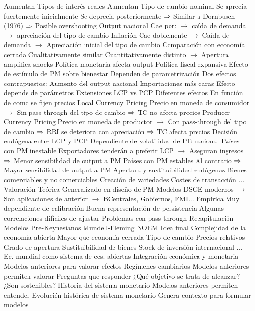 \documentclass{nuevotema}
\begin{document}
\begin{esquemal}
				\4[] Aumentan
				\4 Tipos de interés reales
				\4[] Aumentan
				\4 Tipo de cambio nominal
				\4[] Se aprecia fuertemente inicialmente
				\4[] Se deprecia posteriormente
				\4[] $\then$ Similar a Dornbusch (1976)
				\4[] $\then$ Posible overshooting
				\4 Output nacional
				\4[] Cae por:
				\4[] $\to$ caída de demanda
				\4[] $\to$ apreciación del tipo de cambio
				\4 Inflación
				\4[] Cae doblemente
				\4[] $\to$ Caída de demanda
				\4[] $\to$ Apreciación inicial del tipo de cambio
				\4 Comparación con economía cerrada
				\4[] Cualitativamente similar
				\4[] Cuantitativamente distinto
				\4[] $\to$ Apertura amplifica shocks
				\4[$\then$] Política monetaria afecta output
			\3 Política fiscal expansiva
			\3 Efecto de estímulo de PM sobre bienestar
				\4 Dependen de parametrización
				\4[] Dos efectos contrapuestos:
				\4 Aumento del output nacional
				\4 Importaciones más caras
				\4[$\then$] Efecto depende de parámetros
		\2 Extensiones
			\3 LCP vs PCP
				\4 Diferentes efectos
				\4[] En función de como se fijen precios
				\4 Local Currency Pricing
				\4[] Precio en moneda de consumidor
				\4[] $\to$ Sin pass-through del tipo de cambio
				\4[] $\then$ TC no afecta precios
				\4 Producer Currency Pricing
				\4[] Precio en moneda de productor
				\4[] $\to$ Con pass-through del tipo de cambio
				\4[] $\then$ RRI se deteriora con apreciación
				\4[] $\then$ TC afecta precios
			\3 Decisión endógena entre LCP y PCP
				\4 Dependiente de volatilidad de PE nacional
				\4 Países con PM inestable
				\4[] Exportadores tenderán a preferir LCP
				\4[] $\to$ Aseguran ingresos
				\4[] $\then$ Menor sensibilidad de output a PM
				\4 Países con PM estables
				\4[] Al contrario
				\4[] $\then$ Mayor sensibilidad de output a PM
			\3 Apertura y sustituibilidad endógenas
			\3 Bienes comerciables y no comerciables
			\3 Creación de variedades
			\3 Costes de transacción
			\3 ...
		\2 Valoración
			\3 Teórica
				\4 Generalizado en diseño de PM
				\4 Modelos DSGE modernos
				\4[] $\to$ Son aplicaciones de anterior
				\4[] $\to$ BCentrales, Gobiernos, FMI...
			\3 Empírica
				\4 Muy dependiente de calibración
				\4 Buena representación de persistencia
				\4 Algunas correlaciones difíciles de ajustar
				\4[] Problemas con pass-through
	\1[] 
		\2 Recapitulación
			\3 Modelos Pre-Keynesianos
			\3 Mundell-Fleming
			\3 NOEM
		\2 Idea final
			\3 Complejidad de la economía abierta
				\4 Mayor que economía cerrada
				\4[] Tipo de cambio
				\4[] Precios relativos
				\4[] Grado de apertura
				\4[] Sustituibilidad de bienes
				\4[] Stock de inversión internacional
				\4[] ...
				\4 Ec. mundial como sistema de ecs. abiertas
			\3 Integración económica y monetaria
				\4 Modelos anteriores para valorar efectos
			\3 Regímenes cambiarios
				\4 Modelos anteriores permiten valorar
				\4 Preguntas que responder
				\4[] ¿Qué objetivo se trata de alcanzar?
				\4[] ¿Son sostenibles?
			\3 Historia del sistema monetario
				\4 Modelos anteriores permiten entender
				\4 Evolución histórica de sistema monetario
				\4[] Genera contexto para formular modelos
\end{esquemal}
\end{document}
